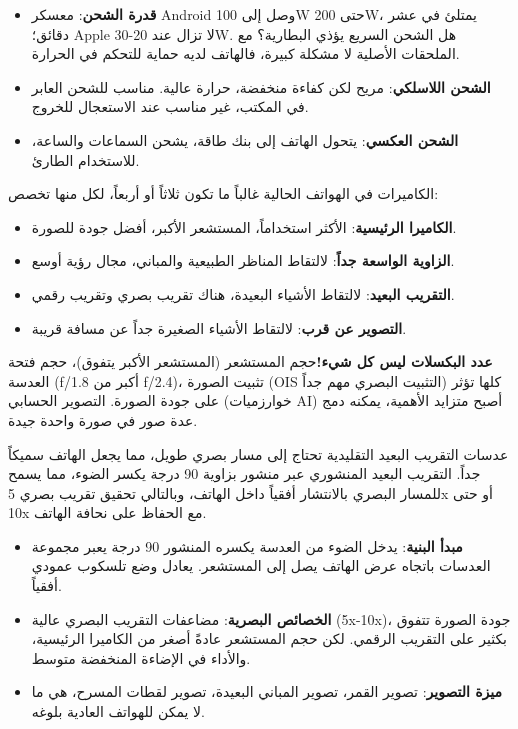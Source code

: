 \begin{itemize}
  \item \textbf{قدرة الشحن}: معسكر Android وصل إلى 100W حتى 200W، يمتلئ في عشر دقائق؛ Apple لا تزال عند 20-30W. هل الشحن السريع يؤذي البطارية؟ مع الملحقات الأصلية لا مشكلة كبيرة، فالهاتف لديه حماية للتحكم في الحرارة.
  \item \textbf{الشحن اللاسلكي}: مريح لكن كفاءة منخفضة، حرارة عالية. مناسب للشحن العابر في المكتب، غير مناسب عند الاستعجال للخروج.
  \item \textbf{الشحن العكسي}: يتحول الهاتف إلى بنك طاقة، يشحن السماعات والساعة، للاستخدام الطارئ.
\end{itemize}


الكاميرات في الهواتف الحالية غالباً ما تكون ثلاثاً أو أربعاً، لكل منها تخصص:

\begin{itemize}
  \item \textbf{الكاميرا الرئيسية}: الأكثر استخداماً، المستشعر الأكبر، أفضل جودة للصورة.
  \item \textbf{الزاوية الواسعة جداً}: لالتقاط المناظر الطبيعية والمباني، مجال رؤية أوسع.
  \item \textbf{التقريب البعيد}: لالتقاط الأشياء البعيدة، هناك تقريب بصري وتقريب رقمي.
  \item \textbf{التصوير عن قرب}: لالتقاط الأشياء الصغيرة جداً عن مسافة قريبة.
\end{itemize}

\textbf{عدد البكسلات ليس كل شيء!}حجم المستشعر (المستشعر الأكبر يتفوق)، حجم فتحة العدسة (f/1.8 أكبر من f/2.4)، تثبيت الصورة (OIS التثبيت البصري مهم جداً) كلها تؤثر على جودة الصورة. التصوير الحسابي (خوارزميات AI) أصبح متزايد الأهمية، يمكنه دمج عدة صور في صورة واحدة جيدة.


عدسات التقريب البعيد التقليدية تحتاج إلى مسار بصري طويل، مما يجعل الهاتف سميكاً جداً. التقريب البعيد المنشوري عبر منشور بزاوية 90 درجة يكسر الضوء، مما يسمح للمسار البصري بالانتشار أفقياً داخل الهاتف، وبالتالي تحقيق تقريب بصري 5x أو حتى 10x مع الحفاظ على نحافة الهاتف.

\begin{itemize}
  \item \textbf{مبدأ البنية}: يدخل الضوء من العدسة يكسره المنشور 90 درجة يعبر مجموعة العدسات باتجاه عرض الهاتف يصل إلى المستشعر. يعادل وضع تلسكوب عمودي أفقياً.
  \item \textbf{الخصائص البصرية}: مضاعفات التقريب البصري عالية (5x-10x)، جودة الصورة تتفوق بكثير على التقريب الرقمي. لكن حجم المستشعر عادةً أصغر من الكاميرا الرئيسية، والأداء في الإضاءة المنخفضة متوسط.
  \item \textbf{ميزة التصوير}: تصوير القمر، تصوير المباني البعيدة، تصوير لقطات المسرح، هي ما لا يمكن للهواتف العادية بلوغه.
\end{itemize}

